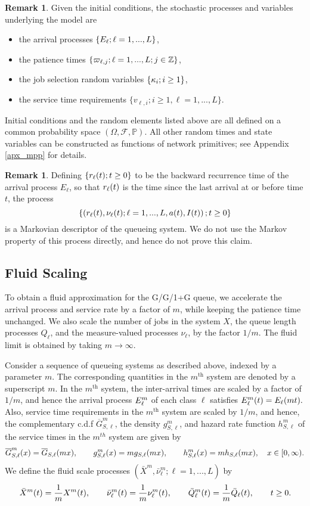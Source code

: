 \documentclass{article}
\theoremstyle{definition}
\newtheorem{remark}[theorem]{Remark}
\numberwithin{equation}{section}
\begin{document}
\begin{remark}
Given the initial conditions, the stochastic processes and variables underlying the model are
\begin{itemize}
\item the arrival processes $\{E_\ell;\ell=1,...,L\}$, 
\item the patience times $\{\varpi_{\ell,j};\ell=1,...,L;j\in\mathbb{Z}\}$,
\item the job selection random variables $\{\kappa_i;i\geq 1\}$, 
\item the service time requirements $\{v_{\ell,i};i\geq1,\ell=1,...,L\}.$ 
\end{itemize}
Initial conditions and the random elements listed above are all defined on a common probability space $(\Omega,\mathcal{F},\mathbb{P})$. All other random times and state variables can be constructed as functions of network primitives; see Appendix \ref{apx_mpp} for details.
\end{remark}

\begin{remark}
Defining $\{r_{\ell}(t);t\geq0\}$ to be the backward recurrence time of the arrival process $E_\ell$, so that $r_{\ell}(t)$ is the time since the last arrival at or before time $t$, the process
\[
\{\left( r_{\ell}(t), \nu_\ell(t);\ell=1,...,L,a(t),I(t) \right);t\geq0\}
\]
is a Markovian descriptor of the queueing system. We do not use the Markov property of this process directly, and hence do not prove this claim.
\end{remark}

\subsection{Fluid Scaling}\label{sec_seq}

To obtain a fluid approximation for the G/G/1+G queue, we accelerate the arrival process and service rate by a factor of $m$, while keeping the patience time unchanged. We also scale the number of jobs in the system $X$, the queue length processes $Q_\ell$, and the measure-valued processes $\nu_\ell$, by the factor $1/m$. The fluid limit is obtained by taking $m\to\infty$.

Consider a sequence of queueing systems as described above, indexed by a parameter $m$. The corresponding quantities in the $m^\text{th}$ system are denoted by a superscript $m$. In the $m^\text{th}$ system, the inter-arrival times are scaled by a factor of $1/m$, and hence the arrival process $E^m_\ell$ of each class $\ell$ satisfies $E^m_\ell(t)=E_\ell(mt).$ Also, service time requirements in the $m^\text{th}$ system are scaled by $1/m$, and hence, the complementary c.d.f $\overline G^m_{S,\ell}$, the density $g^m_{S,\ell}$, and hazard rate function $h^m_{S,\ell}$ of the service times in the $m^{th}$ system are given by
\[
    \overline G^m_{S,\ell}(x)=\overline G_{S,\ell}(mx),\quad\quad g^m_{S,\ell}(x)=m g_{S,\ell}(mx),\quad\quad h^m_{S,\ell}(x)=mh_{S,\ell}(mx),\quad x\in[0,\infty).
\]
We define the fluid scale processes $(\bar X^m, \bar\nu^m_\ell;\ell=1,...,L )$ by
\[
    \bar X^m(t)=\frac{1}{m}X^m(t),\quad \quad \bar\nu^m_\ell(t)=\frac{1}{m}\nu^m_\ell(t),\quad\quad \bar {Q}^m_\ell(t)=\frac{1}{m}\bar {Q}_\ell(t),\quad\quad t\geq0.
\]
\end{document}
